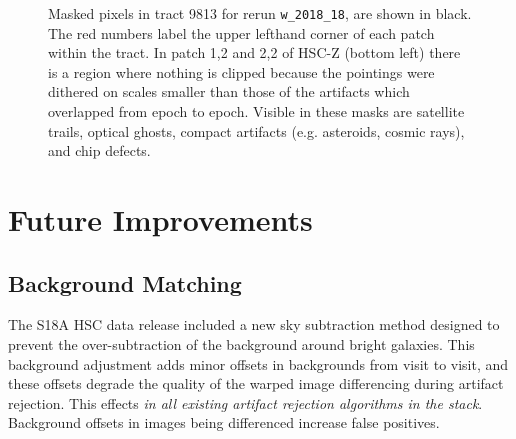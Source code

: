 \documentclass[DM,authoryear,toc]{lsstdoc}
\begin{document}
\begin{figure}
\caption{\label{fig:9813Maps} Masked pixels in tract 9813 for rerun \texttt{w\_2018\_18},  are shown in black. The red numbers label the upper lefthand corner of each patch within the tract. In patch 1,2 and 2,2 of HSC-Z (bottom left) there is a region where nothing is clipped because the pointings were dithered on scales smaller than those of the artifacts which overlapped from epoch to epoch.  Visible in these masks are satellite trails, optical ghosts, compact artifacts (e.g. asteroids, cosmic rays), and chip defects.}
\end{figure}

\section{Future Improvements}

\subsection{Background Matching}
\label{sec:background_matching}

The S18A  HSC data release included a new sky subtraction method designed to prevent the over-subtraction of the background around bright galaxies.
This background adjustment adds minor offsets in backgrounds from visit to visit, and these offsets degrade the quality of the warped image differencing during artifact rejection.
This effects \emph{in all existing artifact rejection algorithms in the stack}.
Background offsets in images being differenced increase false positives.
\end{document}
